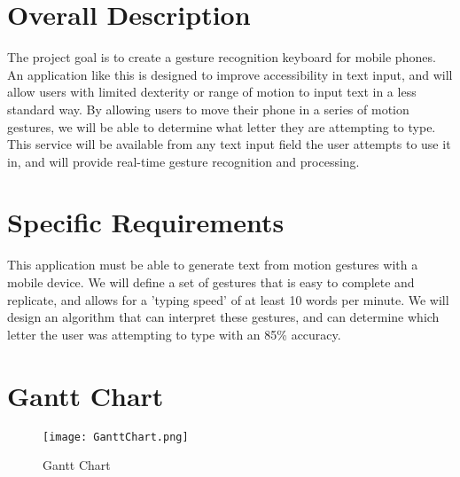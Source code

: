 \documentclass[onecolumn, draftclsnofoot,10pt, journal, letterpaper]{IEEEtran}
\begin{document}
\section{Overall Description}
    The project goal is to create a gesture recognition keyboard for mobile phones. An application like this is designed to improve accessibility in text input, and will allow users with limited dexterity or range of motion to input text in a less standard way. By allowing users to move their phone in a series of motion gestures, we will be able to determine what letter they are attempting to type. This service will be available from any text input field the user attempts to use it in, and will provide real-time gesture recognition and processing.
    

\section{Specific Requirements}
    This application must be able to generate text from motion gestures with a mobile device. We will define a set of gestures that is easy to complete and replicate, and allows for a 'typing speed' of at least 10 words per minute. We will design an algorithm that can interpret these gestures, and can determine which letter the user was attempting to type with an 85\% accuracy.
\newpage
\section{Gantt Chart}
\begin{figure}[htp]
    \centering
    \texttt{[image: GanttChart.png]}
    \caption{Gantt Chart}
    \label{fig:ganntchart}
\end{figure}
\end{document}
